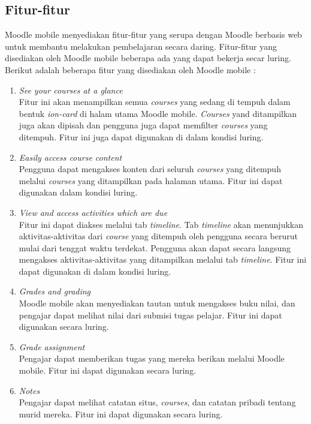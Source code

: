 \subsection{Fitur-fitur}
Moodle mobile menyediakan fitur-fitur yang serupa dengan Moodle berbasis web untuk membantu melakukan pembelajaran secara daring. Fitur-fitur yang disediakan oleh Moodle mobile beberapa ada yang dapat bekerja secar luring. Berikut adalah beberapa fitur yang disediakan oleh Moodle mobile \cite{moodle:39}:

	\begin{enumerate}
		\item \textit{See your courses at a glance} \\
			Fitur ini akan menampilkan semua \textit{courses} yang sedang di tempuh dalam bentuk \textit{ion-card} di halam utama Moodle mobile. \textit{Courses} yand ditampilkan juga akan dipisah %
			dan pengguna juga dapat memfilter \textit{courses} yang ditempuh. Fitur ini juga dapat digunakan di dalam kondisi luring.
		\item \textit{Easily access course content} \\
			Pengguna dapat mengakses konten dari seluruh \textit{courses} yang ditempuh melalui \textit{courses} yang ditampilkan pada halaman utama. Fitur ini dapat digunakan dalam kondisi luring.
		\item \textit{View and access activities which are due} \\
			Fitur ini dapat diakses melalui tab \textit{timeline}. Tab \textit{timeline} akan menunjukkan aktivitas-aktivitas dari \textit{course} yang ditempuh oleh pengguna secara berurut mulai dari tenggat waktu terdekat. Pengguna akan dapat secara langsung mengakses aktivitas-aktivitas yang ditampilkan melalui tab \textit{timeline}. Fitur ini dapat digunakan di dalam kondisi luring.
		\item \textit{Grades and grading} \\
			Moodle mobile akan menyediakan tautan untuk mengakses buku nilai, dan pengajar dapat melihat nilai dari submisi tugas pelajar. Fitur ini dapat digunakan secara luring.
		\item \textit{Grade assignment} \\
			Pengajar dapat memberikan tugas yang mereka berikan melalui Moodle mobile. Fitur ini dapat digunakan secara luring.
		\item \textit{Notes} \\
			Pengajar dapat melihat catatan situs, \textit{courses}, dan catatan pribadi tentang murid mereka. Fitur ini dapat digunakan secara luring.

\end{enumerate}
